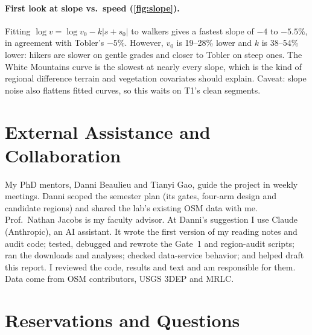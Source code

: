 \documentclass[10pt,twocolumn,letterpaper]{article}
\begin{document}
\paragraph{First look at slope vs.\ speed (\cref{fig:slope}).} Fitting $\log v = \log v_0 - k|s+s_0|$ to walkers gives a fastest slope of $-4$ to $-5.5\%$, in agreement with Tobler's $-5\%$. However, $v_0$ is 19--28\% lower and $k$ is 38--54\% lower: hikers are slower on gentle grades and closer to Tobler on steep ones. The White Mountains curve is the slowest at nearly every slope, which is the kind of regional difference terrain and vegetation covariates should explain. Caveat: slope noise also flattens fitted curves, so this waits on T1's clean segments.

\section{External Assistance and Collaboration}
\label{sec:help}

My PhD mentors, Danni Beaulieu and Tianyi Gao, guide the project in weekly meetings. Danni scoped the semester plan (its gates, four-arm design and candidate regions) and shared the lab's existing OSM data with me. Prof.\ Nathan Jacobs is my faculty advisor. At Danni's suggestion I use Claude (Anthropic), an AI assistant. It wrote the first version of my reading notes and audit code; tested, debugged and rewrote the Gate~1 and region-audit scripts; ran the downloads and analyses; checked data-service behavior; and helped draft this report. I reviewed the code, results and text and am responsible for them. Data come from OSM contributors, USGS 3DEP and MRLC.

\section{Reservations and Questions}
\label{sec:questions}
\end{document}

